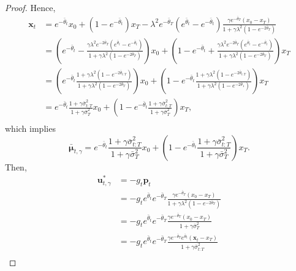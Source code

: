\begin{proof}
Hence, 
\begin{equation}
\begin{split}
    \mathbf{x}_t 
    &= e^{-\bar{\theta}_{t}}x_0 + (1 - e^{-\bar{\theta}_{t}}) x_T - \lambda^2 e^{-\bar{\theta}_{T}} (e^{\bar{\theta}_{t}} - e^{-\bar{\theta}_{t}}) \frac{\gamma e^{-\bar{\theta}_{T}} (x_0 - x_T)}{1 + \gamma \lambda^2 (1 - e^{-2\bar{\theta}_{T}})}  \\
    &= \left(e^{-\bar{\theta}_{t}} - \frac{\gamma \lambda^2 e^{-2\bar{\theta}_{T}} (e^{\bar{\theta}_{t}} - e^{-\bar{\theta}_{t}})}{1 + \gamma \lambda^2 (1 - e^{-2\bar{\theta}_{T}})} \right) x_0 + \left(1 - e^{-\bar{\theta}_{t}} + \frac{\gamma \lambda^2 e^{-2\bar{\theta}_{T}} (e^{\bar{\theta}_{t}} - e^{-\bar{\theta}_{t}})}{1 + \gamma \lambda^2 (1 - e^{-2\bar{\theta}_{T}})} \right) x_T \\
    &= \left(e^{-\bar{\theta}_{t}} \frac{1 + \gamma \lambda^2 (1 - e^{-2\bar{\theta}_{t:T}})}{1 + \gamma \lambda^2 (1 - e^{-2\bar{\theta}_{T}})} \right) x_0 + \left(1 - e^{-\bar{\theta}_{t}} \frac{1 + \gamma \lambda^2 (1 - e^{-2\bar{\theta}_{t:T}})}{1 + \gamma \lambda^2 (1 - e^{-2\bar{\theta}_{1}})}\right) x_T \\
    &= e^{-\bar{\theta}_{t}} \frac{1 + \gamma \bar{\sigma}^2_{t:T}}{1 + \gamma \bar{\sigma}^2_{T}} x_0 + \left(1 - e^{-\bar{\theta}_{t}} \frac{1 + \gamma \bar{\sigma}^2_{t:T}}{1 + \gamma \bar{\sigma}^2_{T}}\right) x_T, \\
\end{split}
\end{equation}
which implies 
\begin{equation}
\bar{\boldsymbol{\mu}}_{t, \gamma} = e^{-\bar{\theta}_{t}} \frac{1 + \gamma \bar{\sigma}^2_{t:T}}{1 + \gamma \bar{\sigma}^2_{T}} x_0 + \left(1 - e^{-\bar{\theta}_{t}} \frac{1 + \gamma \bar{\sigma}^2_{t:T}}{1 + \gamma \bar{\sigma}^2_{T}}\right) x_T.
\end{equation}
Then, 
\begin{equation}
\begin{split}
\mathbf{u}^{*}_{t, \gamma} 
&= - g_t \mathbf{p}_{t} \\
&= - g_t e^{\bar{\theta}_{t}} e^{-\bar{\theta}_{T}} \frac{\gamma e^{-\bar{\theta}_{T}} (x_0 - x_T)}{1 + \gamma \lambda^2 (1 - e^{-2\bar{\theta}_{T}})} \\
&= - g_t e^{\bar{\theta}_{t}} e^{-\bar{\theta}_{T}} \frac{\gamma e^{-\bar{\theta}_{T}} (x_0 - x_T)}{1 + \gamma \bar{\sigma}^2_{T}} \\
&= - g_t e^{\bar{\theta}_{t}} e^{-\bar{\theta}_{T}} \frac{\gamma e^{-\bar{\theta}_{T}} e^{\bar{\theta}_{t}} (\mathbf{x}_t - x_T)}{1 + \gamma \bar{\sigma}^2_{t:T}} \\

\end{split}
\end{equation}
\end{proof}
